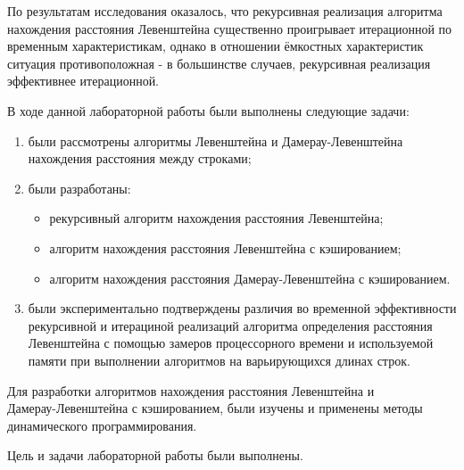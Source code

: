 
По результатам исследования оказалось, что рекурсивная реализация алгоритма нахождения расстояния Левенштейна существенно проигрывает итерационной по временным характеристикам, однако в отношении ёмкостных характеристик ситуация противоположная - в большинстве случаев, рекурсивная реализация эффективнее итерационной.

В ходе данной лабораторной работы были выполнены следующие задачи:
\begin{enumerate}
	\item были рассмотрены алгоритмы Левенштейна и Дамерау-Левенштейна нахождения расстояния между строками;
	\item были разработаны:
	\begin{itemize}
		\item рекурсивный алгоритм нахождения расстояния Левенштейна;
		\item алгоритм нахождения расстояния Левенштейна с кэшированием;
		\item алгоритм нахождения расстояния Дамерау-Левенштейна с кэшированием.
	\end{itemize} 
	\item были экспериментально подтверждены различия во временной эффективности рекурсивной и итерациной реализаций алгоритма определения расстояния Левенштейна с помощью замеров процессорного времени и используемой памяти при выполнении алгоритмов на варьирующихся длинах строк.
\end{enumerate}

Для разработки алгоритмов нахождения расстояния Левенштейна и \\ Дамерау-Левенштейна с кэшированием, были изучены и применены методы динамического программирования.

Цель и задачи лабораторной работы были выполнены.
